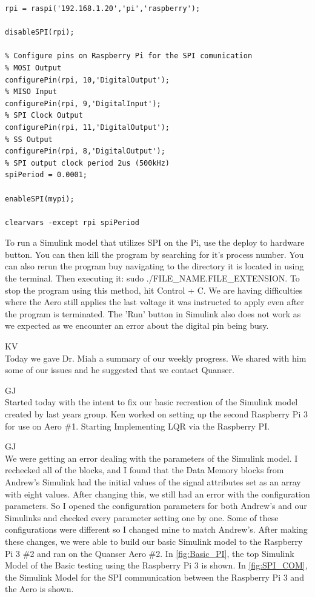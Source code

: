 \documentclass[fontsize=11pt, %
                             paper=letter, %
                             openany, %
                             captions=tableheading,
                             index=totoc,
                             hyperref]{labbook}
\begin{document}
\begin{addmargin}[0cm]{0cm}
\begin{lstlisting}
rpi = raspi('192.168.1.20','pi','raspberry');

disableSPI(rpi);

% Configure pins on Raspberry Pi for the SPI comunication
% MOSI Output
configurePin(rpi, 10,'DigitalOutput');
% MISO Input
configurePin(rpi, 9,'DigitalInput');
% SPI Clock Output
configurePin(rpi, 11,'DigitalOutput');
% SS Output
configurePin(rpi, 8,'DigitalOutput');
% SPI output clock period 2us (500kHz)
spiPeriod = 0.0001;

enableSPI(mypi);

clearvars -except rpi spiPeriod
\end{lstlisting}
To run a Simulink model that utilizes SPI on the Pi, use the  deploy to hardware button.  You can then kill the program by searching for it's process number.  You can also rerun the program buy navigating to the directory it is located in using the terminal. Then executing it: sudo ./FILE\_NAME.FILE\_EXTENSION.  To stop the program using this method, hit Control + C.  We are having difficulties where the Aero still applies the last voltage it was instructed to apply even after the program is terminated.  The 'Run' button in Simulink also does not work as we expected as we encounter an error about the digital pin being busy.

KV\\
Today we gave Dr. Miah a summary of our weekly progress.  We shared with him some of our issues and he suggested that we contact Quanser.

GJ\\
Started today with the intent to fix our basic recreation of the Simulink model created by last years group.  Ken worked on setting up the second Raspberry Pi 3 for use on Aero \#1.  Starting Implementing LQR via the Raspberry PI.

GJ\\
We were getting an error dealing with the parameters of the Simulink model.  I rechecked all of the blocks, and I found that the Data Memory blocks from Andrew's Simulink had the initial values of the signal attributes set as an array with eight values.  After changing this, we still had an error with the configuration parameters.  So I opened the configuration parameters for both Andrew's and our Simulinks and checked every parameter setting one by one.  Some of these configurations were different so I changed mine to match Andrew's.  After making these changes, we were able to build our basic Simulink model to the Raspberry Pi 3 \#2 and ran on the Quanser Aero \#2.  In \autoref{fig:Basic_PI}, the top Simulink Model of the Basic testing using the Raspberry Pi 3 is shown.  In \autoref{fig:SPI_COM}, the Simulink Model for the SPI communication between the Raspberry Pi 3 and the Aero is shown.


\end{addmargin}
\end{document}
